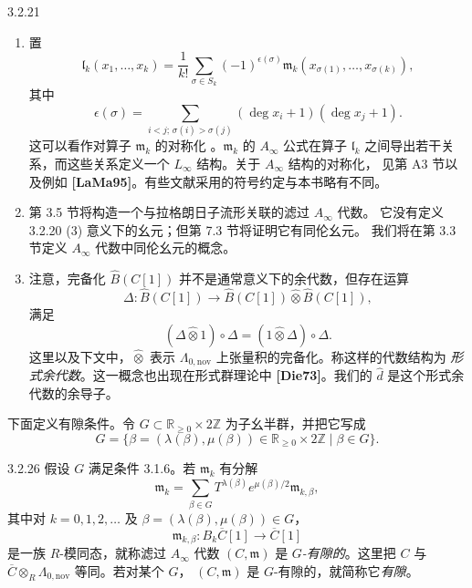 \begin{remark}{3.2.21}
\begin{enumerate}[label=\textup{(\arabic*)},leftmargin=2.8em]
  \item 置
  \begin{equation}
    \mathfrak l_k(x_1,\ldots,x_k)
    =\frac1{k!}\sum_{\sigma\in S_k}(-1)^{\epsilon(\sigma)}
    \mathfrak m_k(x_{\sigma(1)},\ldots,x_{\sigma(k)}),
    \tag{3.2.24}\label{eq:3-2-24}
  \end{equation}
  其中
  \begin{equation}
    \epsilon(\sigma)
    =\sum_{i<j;\,\sigma(i)>\sigma(j)}
    (\deg x_i+1)(\deg x_j+1).
    \tag{3.2.25}\label{eq:3-2-25}
  \end{equation}
  这可以看作对算子 $\mathfrak m_k$ 的对称化
  。$\mathfrak m_k$ 的 $A_\infty$ 公式在算子
  $\mathfrak l_k$ 之间导出若干关系，而这些关系定义一个
  $L_\infty$ 结构。关于 $A_\infty$ 结构的对称化，
  见第 A3 节以及例如 \textbf{[LaMa95]}。有些文献采用的符号约定与本书略有不同。

  \item 第 3.5 节将构造一个与拉格朗日子流形关联的滤过 $A_\infty$ 代数。
  它没有定义 3.2.20 (3) 意义下的幺元；但第 7.3 节将证明它有同伦幺元。
  我们将在第 3.3 节定义 $A_\infty$ 代数中同伦幺元的概念。

  \item 注意，完备化 $\widehat B(C[1])$ 并不是通常意义下的余代数，但存在运算
  \[
    \Delta\colon\widehat B(C[1])
    \longrightarrow
    \widehat B(C[1])\widehat\otimes\widehat B(C[1]),
  \]
  满足
  \[
    (\Delta\widehat\otimes1)\circ\Delta
    =(1\widehat\otimes\Delta)\circ\Delta.
  \]
  这里以及下文中，$\widehat\otimes$ 表示
  $\Lambda_{0,\mathrm{nov}}$ 上张量积的完备化。称这样的代数结构为
  \emph{形式余代数}。这一概念也出现在形式群理论中
  \textbf{[Die73]}。我们的 $\widehat d$ 是这个形式余代数的余导子。
\end{enumerate}
\end{remark}

下面定义有隙条件。令
$G\subset\mathbb R_{\geq0}\times2\mathbb Z$ 为子幺半群，并把它写成
\[
  G=\{\beta=(\lambda(\beta),\mu(\beta))
  \in\mathbb R_{\geq0}\times2\mathbb Z\mid\beta\in G\}.
\]

\begin{definition}{3.2.26}\label{def:3-2-26}
假设 $G$ 满足条件 3.1.6。若 $\mathfrak m_k$ 有分解
\[
  \mathfrak m_k
  =\sum_{\beta\in G}T^{\lambda(\beta)}e^{\mu(\beta)/2}
  \mathfrak m_{k,\beta},
\]
其中对 $k=0,1,2,\ldots$ 及
$\beta=(\lambda(\beta),\mu(\beta))\in G$，
\[
  \mathfrak m_{k,\beta}\colon
  B_k\overline C[1]\longrightarrow\overline C[1]
\]
是一族 $R$-模同态，就称滤过 $A_\infty$ 代数 $(C,\mathfrak m)$ 是
\emph{$G$-有隙的}。这里把
$C$ 与 $\overline C\otimes_R\Lambda_{0,\mathrm{nov}}$ 等同。若对某个 $G$，
$(C,\mathfrak m)$ 是 $G$-有隙的，就简称它\emph{有隙}。
\end{definition}

